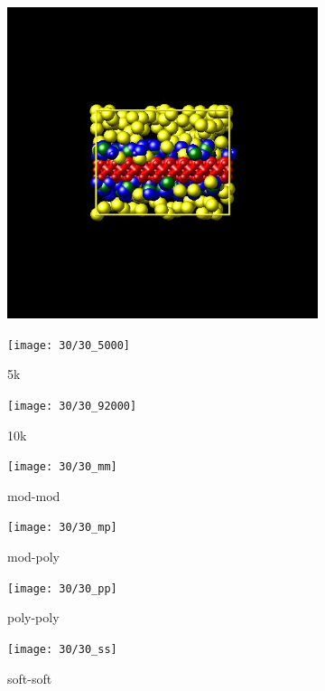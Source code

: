 \documentclass[a4paper]{article}
\begin{document}
\begin{figure}[H]
\begin{subfigure}{0.3\textwidth}
  \centering
  \includegraphics[width=\linewidth,keepaspectratio]{start}
  \caption{}
\end{subfigure}
\begin{subfigure}{0.3\textwidth}
  \centering
  \texttt{[image: 30/30\_5000]}
  \caption{5k}
\end{subfigure}
\begin{subfigure}{0.3\textwidth}
  \centering
  \texttt{[image: 30/30\_92000]}
  \caption{10k}
\end{subfigure}
\caption{}
\label{fig_1}
\end{figure}

\begin{figure}[H]
\begin{subfigure}{0.24\textwidth}
  \centering
  \texttt{[image: 30/30\_mm]}
  \caption{mod-mod}
\end{subfigure}
\begin{subfigure}{0.24\textwidth}
  \centering
  \texttt{[image: 30/30\_mp]}
  \caption{mod-poly}
\end{subfigure}
\begin{subfigure}{0.24\textwidth}
  \centering
  \texttt{[image: 30/30\_pp]}
  \caption{poly-poly}
\end{subfigure}
\begin{subfigure}{0.24\textwidth}
  \centering
  \texttt{[image: 30/30\_ss]}
  \caption{soft-soft}
\end{subfigure}
\caption{}
\label{fig_1}
\end{figure}
\end{document}
